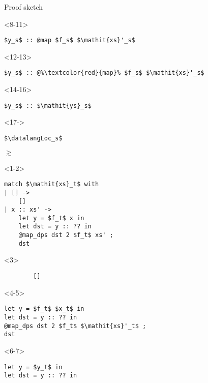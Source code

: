 \begin{frame}[fragile]{Proof sketch}
\begin{minipage}{.4\columnwidth}
    \begin{onlyenv}<8-11>
        \begin{lstlisting}
$y_s$ :: @map $f_s$ $\mathit{xs}'_s$
        \end{lstlisting}
    \end{onlyenv}
    \begin{onlyenv}<12-13>
        \begin{lstlisting}
$y_s$ :: @%\textcolor{red}{map}% $f_s$ $\mathit{xs}'_s$
        \end{lstlisting}
    \end{onlyenv}
    \begin{onlyenv}<14-16>
        \begin{lstlisting}
$y_s$ :: $\mathit{ys}_s$
        \end{lstlisting}
    \end{onlyenv}
    \begin{onlyenv}<17->
        \begin{lstlisting}
$\datalangLoc_s$
        \end{lstlisting}
    \end{onlyenv}
\end{minipage}
\begin{minipage}{.05\columnwidth}
$\gtrsim$
\end{minipage}
\begin{minipage}{.4\columnwidth}
    \begin{onlyenv}<1-2>
        \begin{lstlisting}
match $\mathit{xs}_t$ with
| [] ->
    []
| x :: xs' ->
    let y = $f_t$ x in
    let dst = y :: ?? in
    @map_dps dst 2 $f_t$ xs' ;
    dst
        \end{lstlisting}
    \end{onlyenv}
    \begin{onlyenv}<3>
        \begin{lstlisting}
        []
        \end{lstlisting}
    \end{onlyenv}
    \begin{onlyenv}<4-5>
        \begin{lstlisting}
let y = $f_t$ $x_t$ in
let dst = y :: ?? in
@map_dps dst 2 $f_t$ $\mathit{xs}'_t$ ;
dst
        \end{lstlisting}
    \end{onlyenv}
    \begin{onlyenv}<6-7>
        \begin{lstlisting}
let y = $y_t$ in
let dst = y :: ?? in

\end{lstlisting}
\end{onlyenv}
\end{minipage}
\end{frame}
